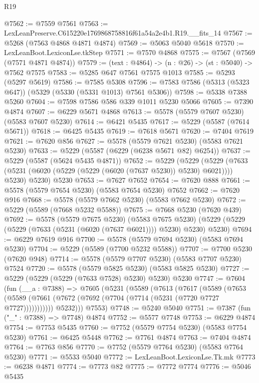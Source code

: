 \begin{lexlean}{R19}
\begin{coremodule}
@7562 := @7559 @7561
@7563 := LexLeanPreserve.C615220e1769868758816f61a54a2e4b1.R19.__fits_14
@7567 := @5268 (@7563 @4868 @4871 @4874)
@7569 := @5063 @5040 @5618
@7570 := LexLeanBoot.LexiconLse.tkStep
@7571 := @7570 @4868
@7575 := @7567 (@7569 (@7571 @4871 @4874))
@7579 := (text : @4864) -> (n : @26) -> (st : @5040) -> @7562 @7575
@7583 := @5285 @647 @7561 @7575 @1013
@7585 := @5293 (@5297 @5619)
@7586 := @7585 @5308
@7596 := @7583 @7586 (@5313 (@5323 @647)) (@5329 (@5330 (@5331 @1013) @7561 @5306))
@7598 := @5338 @7388 @5260
@7604 := @7598 @7586 @586 @339 @1011 @5230 @5066
@7605 := @7390 @4874
@7607 := @6229 @5671 @4868
@7613 := @5578 (@5579 @7607 @5230) (@5583 @7607 @5230)
@7614 := @6421 @5435
@7617 := @5229 (@5587 (@7614 @5671))
@7618 := @6425 @5435
@7619 := @7618 @5671
@7620 := @7404 @7619
@7621 := @7620 @856
@7627 := @5578 (@5579 @7621 @5230) (@5583 @7621 @5230)
@7633 := @5229 (@5587 (@6229 (@6238 @5671 @82) @6254))
@7637 := @5229 (@5587 (@5624 @5435 @4871))
@7652 := @5229
    (@5229
      (@5229 (@7633 (@5231 (@6020 (@5229 (@5229 (@6020 (@7637 @5230)) @5230) @6021)))) @5230)
      @5230)
    @5230
@7653 := @7627 @7652
@7654 := @7620 @888
@7661 := @5578 (@5579 @7654 @5230) (@5583 @7654 @5230) @7652
@7662 := @7620 @916
@7668 := @5578 (@5579 @7662 @5230) (@5583 @7662 @5230)
@7672 := @5229 (@5589 (@7668 @5232 @5588))
@7675 := @7668 @5230 (@7620 @439)
@7692 := @5578
    (@5579 @7675 @5230)
    (@5583 @7675 @5230)
    (@5229 (@5229 (@5229 (@7633 (@5231 (@6020 (@7637 @6021)))) @5230) @5230) @5230)
@7694 := @6229 @7619 @916
@7700 := @5578 (@5579 @7694 @5230) (@5583 @7694 @5230)
@7704 := @5229 (@5589 (@7700 @5232 @5588))
@7707 := @7700 @5230 (@7620 @948)
@7714 := @5578 (@5579 @7707 @5230) (@5583 @7707 @5230) @7524
@7720 := @5578 (@5579 @5825 @5230) (@5583 @5825 @5230)
@7727 := @5229 (@5229 (@5229 (@7633 @7528) @5230) @5230) @5230
@7747 := @7604
    (fun (__a : @7388) =>
    @7605
      (@5231
        (@5589
          (@7613
            (@7617
              (@5589
                (@7653
                  (@5589 (@7661 (@7672 (@7692 (@7704 (@7714 (@5231 (@7720 @7727 @7727)))))))))))
            @5232)))
      @7553)
@7748 := @5240 @5040
@7751 := @7387 (fun ("_" : @7388) => @7748) @4874
@7752 := @5577 @7748
@7753 := @6229 @4874
@7754 := @7753 @5435
@7760 := @7752 (@5579 @7754 @5230) (@5583 @7754 @5230)
@7761 := @6425 @5448
@7762 := @7761 @4874
@7763 := @7404 @4874
@7764 := @7763 @856
@7770 := @7752 (@5579 @7764 @5230) (@5583 @7764 @5230)
@7771 := @5533 @5040
@7772 := LexLeanBoot.LexiconLse.Tk.mk
@7773 := @6238 @4871
@7774 := @7773 @82
@7775 := @7772 @7774
@7776 := @5046 @5435

\end{coremodule}
\end{lexlean}
